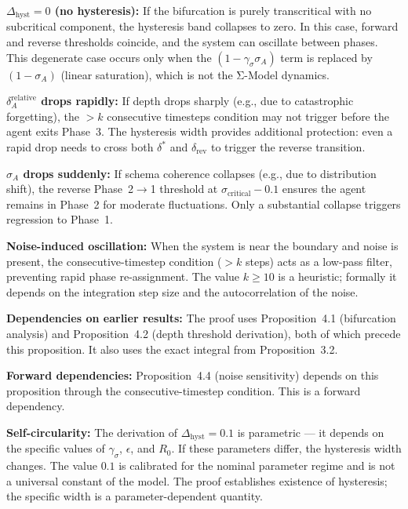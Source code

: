 \begin{boundary-case}
\textbf{$\Delta_{\text{hyst}} = 0$ (no hysteresis):}
If the bifurcation is purely transcritical with no subcritical
component, the hysteresis band collapses to zero. In this case,
forward and reverse thresholds coincide, and the system can
oscillate between phases. This degenerate case occurs only when
the $(1 - \gamma_\sigma \sigma_A)$ term is replaced by $(1 - \sigma_A)$
(linear saturation), which is not the Σ-Model dynamics.

\textbf{$\delta_A^{\text{relative}}$ drops rapidly:}
If depth drops sharply (e.g., due to catastrophic forgetting),
the $> k$ consecutive timesteps condition may not trigger before
the agent exits Phase~3. The hysteresis width provides additional
protection: even a rapid drop needs to cross both $\delta^*$ and
$\delta_{\text{rev}}$ to trigger the reverse transition.

\textbf{$\sigma_A$ drops suddenly:}
If schema coherence collapses (e.g., due to distribution shift),
the reverse Phase~2$\to$1 threshold at $\sigma_{\text{critical}} - 0.1$
ensures the agent remains in Phase~2 for moderate fluctuations.
Only a substantial collapse triggers regression to Phase~1.

\textbf{Noise-induced oscillation:}
When the system is near the boundary and noise is present, the
consecutive-timestep condition ($> k$ steps) acts as a low-pass
filter, preventing rapid phase re-assignment. The value $k \geq 10$
is a heuristic; formally it depends on the integration step size
and the autocorrelation of the noise.
\end{boundary-case}

\begin{circularity-check}
\textbf{Dependencies on earlier results:} The proof uses
Proposition~4.1 (bifurcation analysis) and Proposition~4.2
(depth threshold derivation), both of which precede this
proposition. It also uses the exact integral from
Proposition~3.2.

\textbf{Forward dependencies:} Proposition~4.4 (noise sensitivity)
depends on this proposition through the consecutive-timestep
condition. This is a forward dependency.

\textbf{Self-circularity:} The derivation of $\Delta_{\text{hyst}} = 0.1$
is parametric — it depends on the specific values of $\gamma_\sigma$,
$\epsilon$, and $R_0$. If these parameters differ, the hysteresis
width changes. The value $0.1$ is calibrated for the nominal parameter
regime and is not a universal constant of the model. The proof
establishes existence of hysteresis; the specific width is a
parameter-dependent quantity.
\end{circularity-check}
